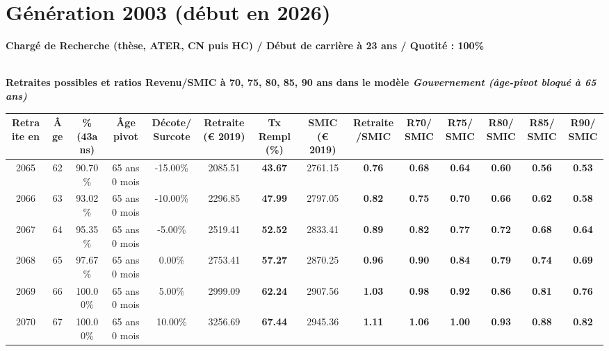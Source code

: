 \newpage 
 
\section{Génération 2003 (début en 2026)\label{CR_100_2003_23_0}} 
 
{\bf \noindent Chargé de Recherche (thèse, ATER, CN puis HC) / Début de carrière à 23 ans / Quotité : 100\%}  ~ 

 ~\\{\bf \noindent Retraites possibles et ratios Revenu/SMIC à 70, 75, 80, 85, 90 ans dans le modèle \emph{Gouvernement (âge-pivot bloqué à 65 ans)}}  
 
\begin{adjustbox}{max width=\textwidth} 
\begin{tabular}[htb]{|c|c||c|c|c||c|c||c|c||c|c|c|c|c|} 
\hline 
 Retraite en &  Âge &  \%(43ans) &  Âge pivot &  Décote/Surcote &  Retraite (\euro{} 2019) &  Tx Rempl(\%) &  SMIC (\euro{} 2019) &  Retraite/SMIC &  R70/SMIC &  R75/SMIC &  R80/SMIC &  R85/SMIC &  R90/SMIC \\ 
\hline \hline 
 2065 &  62 &  90.70\% &  65 ans 0 mois &  -15.00\% &  2085.51 &  {\bf 43.67} &  2761.15 &  {\bf {\color{red} 0.76}} &  {\bf {\color{red} 0.68}} &  {\bf {\color{red} 0.64}} &  {\bf {\color{red} 0.60}} &  {\bf {\color{red} 0.56}} &  {\bf {\color{red} 0.53}} \\ 
\hline 
 2066 &  63 &  93.02\% &  65 ans 0 mois &  -10.00\% &  2296.85 &  {\bf 47.99} &  2797.05 &  {\bf {\color{red} 0.82}} &  {\bf {\color{red} 0.75}} &  {\bf {\color{red} 0.70}} &  {\bf {\color{red} 0.66}} &  {\bf {\color{red} 0.62}} &  {\bf {\color{red} 0.58}} \\ 
\hline 
 2067 &  64 &  95.35\% &  65 ans 0 mois &  -5.00\% &  2519.41 &  {\bf 52.52} &  2833.41 &  {\bf {\color{red} 0.89}} &  {\bf {\color{red} 0.82}} &  {\bf {\color{red} 0.77}} &  {\bf {\color{red} 0.72}} &  {\bf {\color{red} 0.68}} &  {\bf {\color{red} 0.64}} \\ 
\hline 
 2068 &  65 &  97.67\% &  65 ans 0 mois &  0.00\% &  2753.41 &  {\bf 57.27} &  2870.25 &  {\bf {\color{red} 0.96}} &  {\bf {\color{red} 0.90}} &  {\bf {\color{red} 0.84}} &  {\bf {\color{red} 0.79}} &  {\bf {\color{red} 0.74}} &  {\bf {\color{red} 0.69}} \\ 
\hline 
 2069 &  66 &  100.00\% &  65 ans 0 mois &  5.00\% &  2999.09 &  {\bf 62.24} &  2907.56 &  {\bf 1.03} &  {\bf {\color{red} 0.98}} &  {\bf {\color{red} 0.92}} &  {\bf {\color{red} 0.86}} &  {\bf {\color{red} 0.81}} &  {\bf {\color{red} 0.76}} \\ 
\hline 
 2070 &  67 &  100.00\% &  65 ans 0 mois &  10.00\% &  3256.69 &  {\bf 67.44} &  2945.36 &  {\bf 1.11} &  {\bf 1.06} &  {\bf {\color{red} 1.00}} &  {\bf {\color{red} 0.93}} &  {\bf {\color{red} 0.88}} &  {\bf {\color{red} 0.82}} \\ 
\hline 
\hline 
\end{tabular} 
\end{adjustbox} 
 
